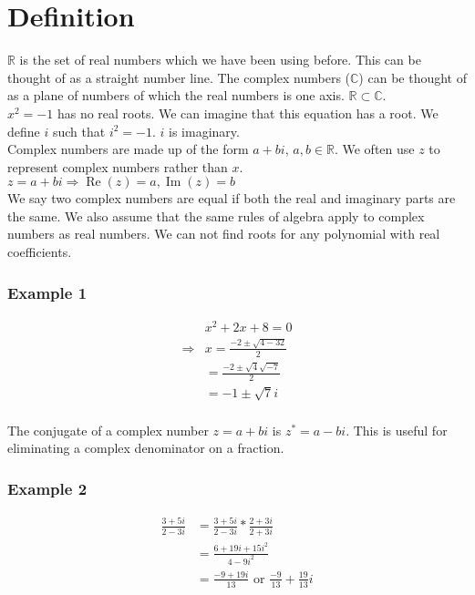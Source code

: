 \documentclass[class=article, crop=false]{standalone}
\begin{document}
\section*{Definition}
$\mathbb{R}$ is the set of real numbers which we have been using before. This can be thought of as a straight number line. The complex numbers ($\mathbb{C}$) can be thought of as a plane of numbers of which the real numbers is one axis. $\mathbb{R} \subset \mathbb{C}$. \\

$x^2 = -1$ has no real roots. We can imagine that this equation has a root. We define $i$ such that $i^2 = -1$. $i$ is imaginary. \\

Complex numbers are made up of the form $a+bi$, $a,b \in \mathbb{R}$. We often use $z$ to represent complex numbers rather than $x$. \\

$z = a+bi \Rightarrow \operatorname{Re}(z)=a, \operatorname{Im}(z)=b$ \\

We say two complex numbers are equal if both the real and imaginary parts are the same. We also assume that the same rules of algebra apply to complex numbers as real numbers. We can not find roots for any polynomial with real coefficients. 

\subsubsection*{Example 1}
\begin{align*}
& x^2 + 2x + 8 = 0 \\
\Rightarrow & x = \frac{-2 \pm \sqrt{4-32}}{2} \\
& = \frac{-2 \pm \sqrt{4} \sqrt{-7}}{2} \\
& = -1 \pm \sqrt{7}i \\
\end{align*}

The conjugate of a complex number $z = a+bi$ is $z^* = a-bi$. This is useful for eliminating a complex denominator on a fraction. 
\subsubsection*{Example 2}
\begin{align*}
\frac{3 + 5i}{2-3i} & = \frac{3 + 5i}{2-3i} * \frac{2+3i}{2+3i} \\
& = \frac{6 + 19i + 15i^2}{4-9i^2} \\
& = \frac{-9 + 19i}{13} \text{ or } \frac{-9}{13} + \frac{19}{13}i \\
\end{align*}
\end{document}

